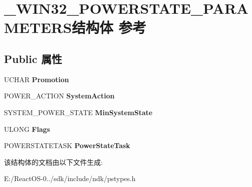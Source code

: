 \hypertarget{struct___w_i_n32___p_o_w_e_r_s_t_a_t_e___p_a_r_a_m_e_t_e_r_s}{}\section{\+\_\+\+W\+I\+N32\+\_\+\+P\+O\+W\+E\+R\+S\+T\+A\+T\+E\+\_\+\+P\+A\+R\+A\+M\+E\+T\+E\+R\+S结构体 参考}
\label{struct___w_i_n32___p_o_w_e_r_s_t_a_t_e___p_a_r_a_m_e_t_e_r_s}
\subsection*{Public 属性}
\begin{DoxyCompactItemize}
\item 
\mbox{\label{struct___w_i_n32___p_o_w_e_r_s_t_a_t_e___p_a_r_a_m_e_t_e_r_s_a2acee46c9266f3a2db661d2760f02a18}} 
U\+C\+H\+AR {\bfseries Promotion}
\item 
\mbox{\label{struct___w_i_n32___p_o_w_e_r_s_t_a_t_e___p_a_r_a_m_e_t_e_r_s_a64033c463c710c7c0d4028c8a458e1aa}} 
P\+O\+W\+E\+R\+\_\+\+A\+C\+T\+I\+ON {\bfseries System\+Action}
\item 
\mbox{\label{struct___w_i_n32___p_o_w_e_r_s_t_a_t_e___p_a_r_a_m_e_t_e_r_s_a06e5441807e6ad1a2fd4ae65be6ad019}} 
S\+Y\+S\+T\+E\+M\+\_\+\+P\+O\+W\+E\+R\+\_\+\+S\+T\+A\+TE {\bfseries Min\+System\+State}
\item 
\mbox{\label{struct___w_i_n32___p_o_w_e_r_s_t_a_t_e___p_a_r_a_m_e_t_e_r_s_abcd6599b8238201278b9c2fb09d7e1d0}} 
U\+L\+O\+NG {\bfseries Flags}
\item 
\mbox{\label{struct___w_i_n32___p_o_w_e_r_s_t_a_t_e___p_a_r_a_m_e_t_e_r_s_abf70b5bec1527367d05aa01ede0b3504}} 
P\+O\+W\+E\+R\+S\+T\+A\+T\+E\+T\+A\+SK {\bfseries Power\+State\+Task}
\end{DoxyCompactItemize}


该结构体的文档由以下文件生成\+:\begin{DoxyCompactItemize}
\item 
E\+:/\+React\+O\+S-\/0../sdk/include/ndk/pstypes.\+h\end{DoxyCompactItemize}
